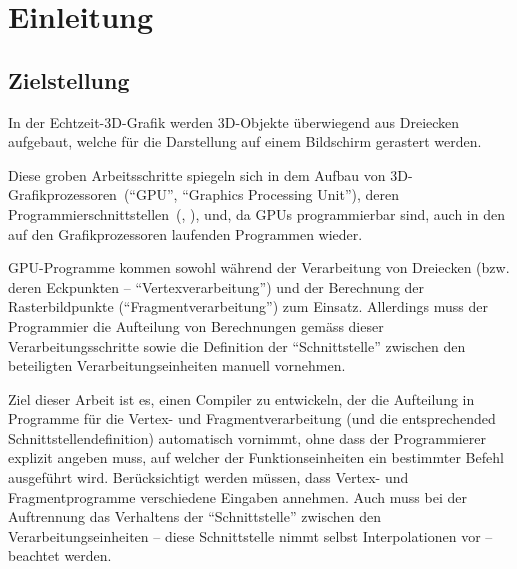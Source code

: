 \documentclass[twoside,a4paper,fleqn,12pt]{book}
\begin{document}
\newcommand\emphalt[1]{\textbf{#1}}

\newcommand\freqPerMesh[1]{\framebox{#1}}
\newcommand\freqPerVert[1]{\colorbox{SpringGreen}{\textcolor{Black}{#1}}}
\newcommand\freqPerFrag[1]{\colorbox{BlueViolet}{\textcolor{White}{#1}}}

\chapter{Einleitung}

\section{Zielstellung}

In der Echtzeit-3D-Grafik werden 3D-Objekte überwiegend aus Dreiecken aufgebaut, welche für die Darstellung
auf einem Bildschirm gerastert werden.

Diese groben Arbeitsschritte spiegeln sich in dem Aufbau von 3D-Grafikprozessoren~(``\gls{GPU}'', ``Graphics Processing Unit''),
deren Programmierschnittstellen~(\cite{glspec4}, \cite{dx10}), und, da GPUs programmierbar sind,
auch in den auf den Grafikprozessoren laufenden Programmen wieder.

GPU-Programme  kommen sowohl während der Verarbeitung von Dreiecken (bzw. deren Eckpunkten -- "`Vertexverarbeitung"') 
und der Berechnung der Rasterbildpunkte ("`Fragmentverarbeitung"') zum Einsatz.
Allerdings muss der Programmier die Aufteilung von Berechnungen gemäss dieser Verarbeitungsschritte sowie die Definition der "`Schnittstelle"'
zwischen den beteiligten Verarbeitungseinheiten manuell vornehmen.

Ziel dieser Arbeit ist es, einen Compiler zu entwickeln, der die Aufteilung in Programme für die Vertex- und Fragmentverarbeitung
(und die entsprechended Schnittstellendefinition) automatisch vornimmt,
ohne dass der Programmierer explizit angeben muss, auf welcher der Funktionseinheiten ein bestimmter Befehl ausgeführt wird.
Berücksichtigt werden müssen, dass Vertex- und Fragmentprogramme verschiedene Eingaben annehmen.
Auch muss bei der Auftrennung das Verhaltens der "`Schnittstelle"' zwischen den Verarbeitungseinheiten --
diese Schnittstelle nimmt selbst Interpolationen vor -- beachtet werden.
\end{document}
